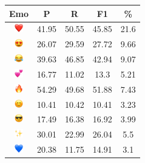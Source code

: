 \documentclass{article}
\begin{document}
\begin{table}
\centering
\begin{tabular}{|c|ccc|c|} \hline
\textbf{Emo} & \textbf{P} & \textbf{R} & \textbf{F1} & \textbf{\%} \\ \hline
\includegraphics[height=0.37cm,width=0.37cm]{img/red_heart.png} & 41.95 & 50.55 & 45.85 & 21.6\\ 
\includegraphics[height=0.37cm,width=0.37cm]{img/smiling_face_with_hearteyes.png} & 26.07 & 29.59 & 27.72 & 9.66\\ 
\includegraphics[height=0.37cm,width=0.37cm]{img/face_with_tears_of_joy.png} & 39.63 & 46.85 & 42.94 & 9.07\\ 
\includegraphics[height=0.37cm,width=0.37cm]{img/two_hearts.png} & 16.77 & 11.02 & 13.3 & 5.21\\ 
\includegraphics[height=0.37cm,width=0.37cm]{img/fire.png} & 54.29 & 49.68 & 51.88 & 7.43\\ 
\includegraphics[height=0.37cm,width=0.37cm]{img/smiling_face_with_smiling_eyes.png} & 10.41 & 10.42 & 10.41 & 3.23\\ 
\includegraphics[height=0.37cm,width=0.37cm]{img/smiling_face_with_sunglasses.png} & 17.49 & 16.38 & 16.92 & 3.99\\ 
\includegraphics[height=0.37cm,width=0.37cm]{img/sparkles.png} & 30.01 & 22.99 & 26.04 & 5.5\\ 
\includegraphics[height=0.37cm,width=0.37cm]{img/blue_heart.png} & 20.38 & 11.75 & 14.91 & 3.1\\ 

\end{tabular}
\end{table}
\end{document}
